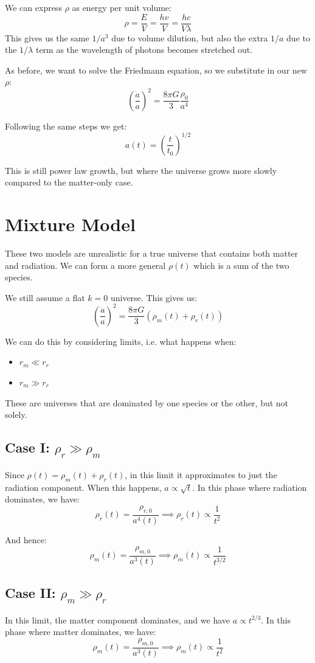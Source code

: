 We can express $\rho$ as energy per unit volume:
\[
    \rho = \frac{E}{V} = \frac{hv}{V} = \frac{hc}{V \lambda}
\]
This gives us the same $1/a^3$ due to volume dilution, but also the extra $1/a$ due to the $1/\lambda$ term as the wavelength of photons becomes stretched out.

As before, we want to solve the Friedmann equation, so we substitute in our new $\rho$:
\[
    \left(\frac{\dot{a}}{a}\right)^2 = \frac{8 \pi G}{3} \frac{\rho_0}{a^4}
\]

Following the same steps we get:
\[
    a(t) = \left(\frac{t}{t_0}\right)^{1/2}
\]

This is still power law growth, but where the universe grows more slowly compared to the matter-only case.

\section{Mixture Model}
These two models are unrealistic for a true universe that contains both matter and radiation. We can form a more general $\rho(t)$ which is a sum of the two species.

We still assume a flat $k = 0$ universe. This gives us:
\[
    \left(\frac{\dot{a}}{a}\right)^2 = \frac{8 \pi G}{3} \left(\rho_m(t) + \rho_r(t)\right)
\]

We can do this by considering limits, i.e. what happens when:
\begin{itemize}
    \item $r_m \ll r_r$
    \item $r_m \gg r_r$
\end{itemize}
These are universes that are dominated by one species or the other, but not solely.

\subsection{Case I: $\rho_r \gg \rho_m$}
Since $\rho(t) = \rho_m(t) + \rho_r(t)$, in this limit it approximates to just the radiation component. When this happens, $a \propto \sqrt{t}$. In this phase where radiation dominates, we have:
\[
    \rho_r(t) = \frac{\rho_{r, 0}}{a^4(t)} \implies \rho_r(t) \propto \frac{1}{t^2}
\]

And hence:
\[
    \rho_m(t) = \frac{\rho_{m, 0}}{a^3(t)} \implies \rho_m(t) \propto \frac{1}{t^{3/2}}
\]

\subsection{Case II: $\rho_m \gg \rho_r$}
In this limit, the matter component dominates, and we have $a \propto t^{2/3}$. In this phase where matter dominates, we have:
\[
    \rho_m(t) = \frac{\rho_{m, 0}}{a^3(t)} \implies \rho_m(t) \propto \frac{1}{t^2}
\]  

